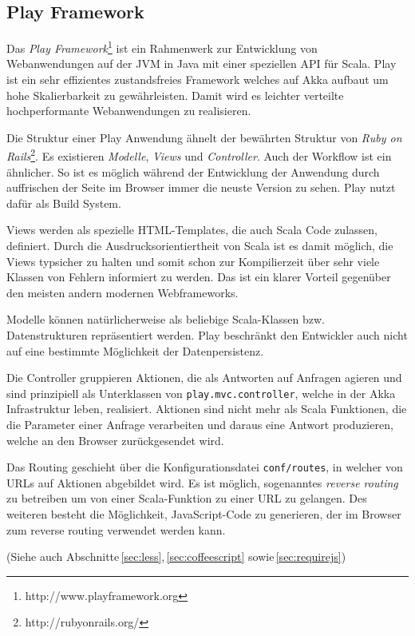 \subsection{Play Framework}

Das \textit{Play Framework}\footnote{http://www.playframework.org} ist ein Rahmenwerk zur
Entwicklung von Webanwendungen auf der JVM in Java mit einer speziellen API für Scala. Play ist ein
sehr effizientes zustandsfreies Framework welches auf Akka aufbaut um hohe Skalierbarkeit zu
gewährleisten. Damit wird es leichter verteilte hochperformante Webanwendungen zu realisieren.

Die Struktur einer Play Anwendung ähnelt der bewährten Struktur von \textit{Ruby on
Rails}\footnote{http://rubyonrails.org/}. Es existieren \textit{Modelle}, \textit{Views} und
\textit{Controller}. Auch der Workflow ist ein ähnlicher. So ist es möglich während der
Entwicklung der Anwendung durch auffrischen der Seite im Browser immer die neuste Version zu sehen.
Play nutzt dafür  als Build System.

Views werden als spezielle HTML-Templates, die auch Scala Code zulassen, definiert. Durch die
Ausdrucksorientiertheit von Scala ist es damit möglich, die Views typsicher zu halten und somit schon
zur Kompilierzeit über sehr viele Klassen von Fehlern informiert zu werden. Das ist ein klarer
Vorteil gegenüber den meisten andern modernen Webframeworks.

Modelle können natürlicherweise als beliebige Scala-Klassen bzw. Datenstrukturen repräsentiert
werden. Play beschränkt den Entwickler auch nicht auf eine bestimmte Möglichkeit der
Datenpersistenz.

Die Controller gruppieren Aktionen, die als Antworten auf Anfragen agieren und sind prinzipiell
als Unterklassen von \texttt{play.mvc.controller}, welche in der Akka Infrastruktur leben,
realisiert. Aktionen sind nicht mehr als Scala Funktionen, die die Parameter einer Anfrage
verarbeiten und daraus eine Antwort produzieren, welche an den Browser zurückgesendet wird.

Das Routing geschieht über die Konfigurationsdatei \texttt{conf/routes}, in welcher von URLs auf
Aktionen abgebildet wird. Es ist möglich, sogenanntes \textit{reverse routing} zu betreiben um von
einer Scala-Funktion zu einer URL zu gelangen. Des weiteren besteht die Möglichkeit, JavaScript-Code 
zu generieren, der im Browser zum reverse routing verwendet werden kann.

(Siehe auch Abschnitte\,\ref{sec:less},\,\ref{sec:coffeescript} sowie\,\ref{sec:requirejs})

\label{sec:play}
